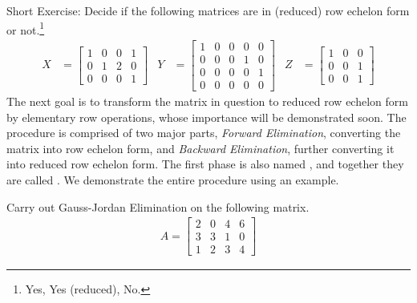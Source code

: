 Short Exercise: Decide if the following matrices are in (reduced) row echelon form or not.\footnote{Yes, Yes (reduced), No.}
\begin{align*}
X &= 
\begin{bmatrix}
1 & 0 & 0 & 1 \\
0 & 1 & 2 & 0 \\
0 & 0 & 0 & 1
\end{bmatrix}
& Y&=
\begin{bmatrix}
1 & 0 & 0 & 0 & 0 \\
0 & 0 & 0 & 1 & 0 \\
0 & 0 & 0 & 0 & 1 \\
0 & 0 & 0 & 0 & 0
\end{bmatrix}
& Z&=
\begin{bmatrix}
1 & 0 & 0 \\
0 & 0 & 1 \\
0 & 0 & 1 
\end{bmatrix}
\end{align*}
The next goal is to transform the matrix in question to reduced row echelon form by elementary row operations, whose importance will be demonstrated soon. The procedure is comprised of two major parts, \textit{Forward Elimination}, converting the matrix into row echelon form, and \textit{Backward Elimination}, further converting it into reduced row echelon form. The first phase is also named , and together they are called . We demonstrate the entire procedure using an example.
\begin{exmp}
Carry out Gauss-Jordan Elimination on the following matrix.
\begin{align*}
A =
\begin{bmatrix}
2 & 0 & 4 & 6 \\
3 & 3 & 1 & 0 \\
1 & 2 & 3 & 4
\end{bmatrix}    
\end{align*}
\end{exmp}
